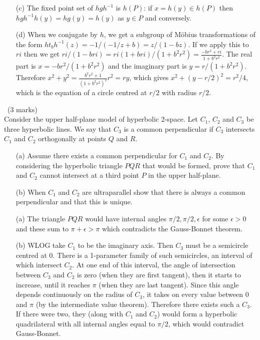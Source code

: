 \documentclass[12pt]{article}
\begin{document}
\begin{answer}
\begin{enumerate}
  \item[(c)] The fixed point set of $hgh^{-1}$ is $h(P)$: if $x=h(y)\in h(P)$ then $hgh^{-1}h(y)=hg(y)=h(y)$ as $y\in P$ and conversely.
  \item[(d)] When we conjugate by $h$, we get a subgroup of M\"obius transformations of the form $ht_bh^{-1}(z)=-1/(-1/z+b)=z/(1-bz)$. If we apply this to $ri$ then we get $ri/(1-bri)=ri(1+bri)/(1+b^2r^2)=\frac{-br^2+ri}{1+b^2r^2}$. The real part is $x=-br^2/(1+b^2r^2)$ and the imaginary part is $y=r/(1+b^2r^2)$. Therefore $x^2+y^2=\frac{b^2r^2+1}{(1+b^2r^2)^2}r^2=ry$, which gives $x^2+(y-r/2)^2=r^2/4$, which is the equation of a circle centred at $r/2$ with radius $r/2$.
  \end{enumerate}
\end{answer}

\newpage

\begin{question}\ (3 marks)\\
  Consider the upper half-plane model of hyperbolic 2-space. Let $C_1$, $C_2$ and $C_3$ be three hyperbolic lines. We say that $C_3$ is a common perpendicular if $C_3$ intersects $C_1$ and $C_2$ orthogonally at points $Q$ and $R$.
  \begin{enumerate}
  \item[(a)] Assume there exists a common perpendicular for $C_1$ and $C_2$. By considering the hyperbolic triangle $PQR$ that would be formed, prove that $C_1$ and $C_2$ cannot intersect at a third point $P$ in the upper half-plane.
  \item[(b)] When $C_1$ and $C_2$ are ultraparallel show that there is always a common perpendicular and that this is unique.
  \end{enumerate}
\end{question}
\begin{answer}
  \begin{enumerate}
  \item[(a)] The triangle $PQR$ would have internal angles $\pi/2,\pi/2,\epsilon$ for some $\epsilon>0$ and these sum to $\pi+\epsilon>\pi$ which contradicts the Gauss-Bonnet theorem.
  \item[(b)] WLOG take $C_1$ to be the imaginary axis. Then $C_3$ must be a semicircle centred at $0$. There is a 1-parameter family of such semicircles, an interval of which intersect $C_2$. At one end of this interval, the angle of intersection between $C_3$ and $C_2$ is zero (when they are first tangent), then it starts to increase, until it reaches $\pi$ (when they are last tangent). Since this angle depends continuously on the radius of $C_3$, it takes on every value between $0$ and $\pi$ (by the intermediate value theorem). Therefore there exists such a $C_3$. If there were two, they (along with $C_1$ and $C_2$) would form a hyperbolic quadrilateral with all internal angles equal to $\pi/2$, which would contradict Gauss-Bonnet.
  \end{enumerate}
\end{answer}
\newpage
\end{document}
